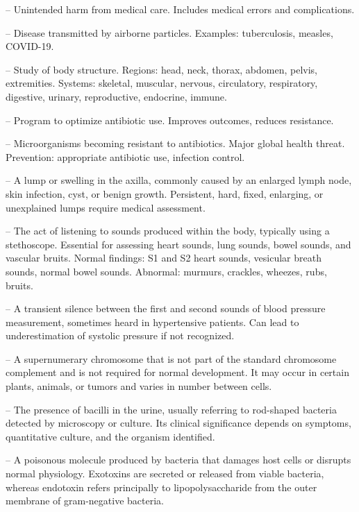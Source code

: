 -- Unintended harm from medical care. Includes medical errors and complications.

-- Disease transmitted by airborne particles. Examples: tuberculosis, measles, COVID-19.

-- Study of body structure. Regions: head, neck, thorax, abdomen, pelvis, extremities. Systems: skeletal, muscular, nervous, circulatory, respiratory, digestive, urinary, reproductive, endocrine, immune.

-- Program to optimize antibiotic use. Improves outcomes, reduces resistance.

-- Microorganisms becoming resistant to antibiotics. Major global health threat. Prevention: appropriate antibiotic use, infection control.

-- A lump or swelling in the axilla, commonly caused by an enlarged lymph node, skin infection, cyst, or benign growth. Persistent, hard, fixed, enlarging, or unexplained lumps require medical assessment.

-- The act of listening to sounds produced within the body, typically using a stethoscope. Essential for assessing heart sounds, lung sounds, bowel sounds, and vascular bruits. Normal findings: S1 and S2 heart sounds, vesicular breath sounds, normal bowel sounds. Abnormal: murmurs, crackles, wheezes, rubs, bruits.

-- A transient silence between the first and second sounds of blood pressure measurement, sometimes heard in hypertensive patients. Can lead to underestimation of systolic pressure if not recognized.

-- A supernumerary chromosome that is not part of the standard chromosome complement and is not required for normal development. It may occur in certain plants, animals, or tumors and varies in number between cells.

-- The presence of bacilli in the urine, usually referring to rod-shaped bacteria detected by microscopy or culture. Its clinical significance depends on symptoms, quantitative culture, and the organism identified.

-- A poisonous molecule produced by bacteria that damages host cells or disrupts normal physiology. Exotoxins are secreted or released from viable bacteria, whereas endotoxin refers principally to lipopolysaccharide from the outer membrane of gram-negative bacteria.

